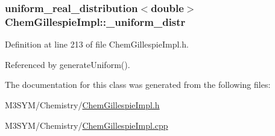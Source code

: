 \hypertarget{classChemGillespieImpl_a6d37367996fad3157b63e6750ce6569b}{
\subsubsection[{\+\_\+uniform\+\_\+distr}]{\setlength{\rightskip}{0pt plus 5cm}uniform\+\_\+real\+\_\+distribution$<$double$>$ Chem\+Gillespie\+Impl\+::\+\_\+uniform\+\_\+distr\hspace{0.3cm}{\ttfamily [private]}}}\label{classChemGillespieImpl_a6d37367996fad3157b63e6750ce6569b}


Definition at line 213 of file Chem\+Gillespie\+Impl.\+h.



Referenced by generate\+Uniform().



The documentation for this class was generated from the following files\+:\begin{DoxyCompactItemize}
\item 
M3\+S\+Y\+M/\+Chemistry/\hyperlink{ChemGillespieImpl_8h}{Chem\+Gillespie\+Impl.\+h}\item 
M3\+S\+Y\+M/\+Chemistry/\hyperlink{ChemGillespieImpl_8cpp}{Chem\+Gillespie\+Impl.\+cpp}\end{DoxyCompactItemize}
